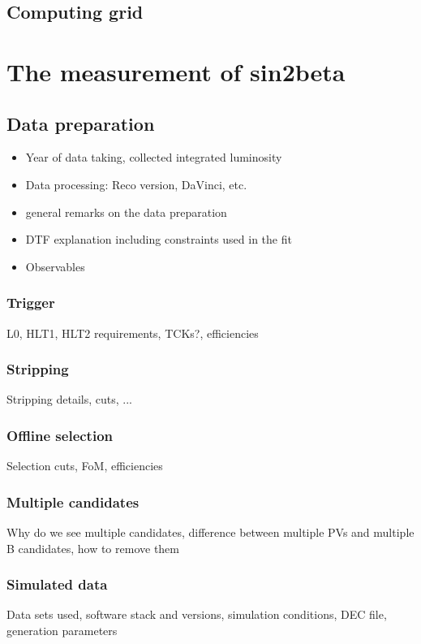 \section{Computing grid}

\chapter{The measurement of sin2beta}
\section{Data preparation}
\begin{itemize}
  \item Year of data taking, collected integrated luminosity
  \item Data processing: Reco version, DaVinci, etc.
  \item general remarks on the data preparation
  \item DTF explanation including constraints used in the fit
  \item Observables
\end{itemize}

\subsection{Trigger}
L0, HLT1, HLT2 requirements, TCKs?, efficiencies

\subsection{Stripping}
Stripping details, cuts, ...

\subsection{Offline selection}
Selection cuts, FoM, efficiencies

\subsection{Multiple candidates}
Why do we see multiple candidates, difference between multiple PVs and multiple B candidates, how to remove them

\subsection{Simulated data}
Data sets used, software stack and versions, simulation conditions, DEC file, generation parameters


